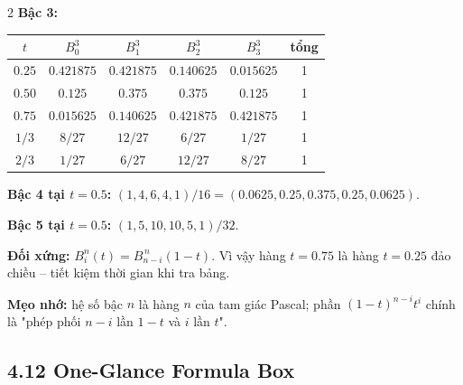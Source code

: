 \begin{paracol}{2}
\textbf{Bậc 3:}
\begin{center}\small
\begin{tabular}{c|cccc|c}
$t$ & $B_0^3$ & $B_1^3$ & $B_2^3$ & $B_3^3$ & tổng\\\midrule
$0.25$ & $0.421875$ & $0.421875$ & $0.140625$ & $0.015625$ & 1\\
$0.50$ & $0.125$ & $0.375$ & $0.375$ & $0.125$ & 1\\
$0.75$ & $0.015625$ & $0.140625$ & $0.421875$ & $0.421875$& 1\\
$1/3$  & $8/27$ & $12/27$ & $6/27$ & $1/27$ & 1\\
$2/3$  & $1/27$ & $6/27$ & $12/27$ & $8/27$ & 1\\
\end{tabular}
\end{center}

\textbf{Bậc 4 tại $t=0.5$:}
$(1,4,6,4,1)/16=(0.0625,0.25,0.375,0.25,0.0625)$.

\textbf{Bậc 5 tại $t=0.5$:}
$(1,5,10,10,5,1)/32$.

\textbf{Đối xứng:} $B_i^n(t)=B_{n-i}^{\,n}(1-t)$. Vì vậy hàng $t=0.75$ là hàng $t=0.25$ đảo chiều -- tiết kiệm thời gian khi tra bảng.

\textbf{Mẹo nhớ:} hệ số bậc $n$ là hàng $n$ của tam giác Pascal; phần $(1-t)^{n-i}t^i$ chính là "phép phối $n-i$ lần $1-t$ và $i$ lần $t$".

\switchcolumn*

\subsection*{4.12 One-Glance Formula Box}


\end{paracol}
